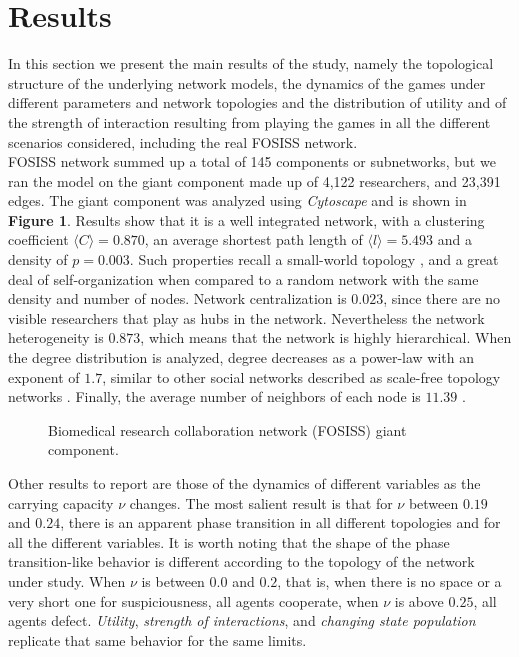 \documentclass{bmcart}
\def\texttt{[image: ]}
\begin{document}
\section*{Results}

In this section we present the main results of the study, namely the
topological structure of the underlying network models, the dynamics
of the games under different parameters and network topologies and the
distribution of utility and of the strength of interaction resulting
from playing the games in all the different scenarios considered,
including the real FOSISS network.\\


FOSISS network summed up a total of 145 components or subnetworks, but
we ran the model on the giant component made up of 4,122 researchers,
and 23,391 edges.  The giant component was analyzed using
\textit{Cytoscape} and is shown in \textbf{Figure 1}. Results show
that it is a well integrated network, with a clustering coefficient
$\langle C \rangle = 0.870$, an average shortest path length of
$\langle l \rangle = 5.493$ and a density of $p = 0.003$. Such
properties recall a small-world topology \cite{WattsStrogatz:98}, and
a great deal of self-organization when compared to a random network
with the same density and number of nodes. Network centralization is
$0.023$, since there are no visible researchers that play as hubs in
the network. Nevertheless the network heterogeneity is $0.873$, which
means that the network is highly hierarchical. When the degree
distribution is analyzed, degree decreases as a power-law with an
exponent of $1.7$, similar to other social networks described as
scale-free topology networks \cite{BarabasiAlbert:99}. Finally, the
average number
of neighbors of each node is $11.39$ \cite{Shannon:2003}.\\


\begin{figure} [h!]
\centering
\caption{Biomedical research collaboration network (FOSISS) giant component.}\label{Fosiss_GC}
\end{figure}


Other results to report are those of the dynamics of different
variables as the carrying capacity $\nu$ changes. The  most salient
result is that for $\nu$ between $0.19$ and $0.24$, there is an
apparent phase transition in all different topologies and for all the
different variables. It is worth noting that the shape
of the phase transition-like behavior is different according to the topology of the
network under study. When $\nu$ is between $0.0$ and $0.2$, that is, when there is
no space or a very short one for suspiciousness, all agents cooperate, when
$\nu$ is above $0.25$, all agents defect. \textit{Utility},
\textit{strength of interactions}, and \textit{changing state population}
replicate that same behavior for the same limits. \\ 
\end{document}
